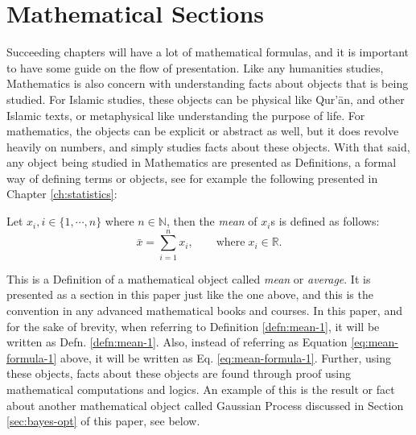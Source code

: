 \section{Mathematical Sections}
Succeeding chapters will have a lot of mathematical formulas, and it is important to have some guide on the flow of presentation. Like any humanities studies, Mathematics is also concern with understanding facts about objects that is being studied. For Islamic studies, these objects can be physical like Qur'\=an, and other Islamic texts, or metaphysical like understanding the purpose of life. For mathematics, the objects can be explicit or abstract as well, but it does revolve heavily on numbers, and simply studies facts about these objects. With that said, any object being studied in Mathematics are presented as Definitions, a formal way of defining terms or objects, see for example the following presented in Chapter \ref{ch:statistics}:
\begin{defn}[Mean]\label{defn:mean-1}
Let $x_i, i\in\{1,\cdots,n\}$ where $n\in\mathbb{N}$, then the \textit{mean} of $x_i$s is defined as follows:
\begin{equation}\label{eq:mean-formula-1}
    \bar{x} = \sum_{i=1}^n x_i, \qquad\text{where}\;x_i \in\mathbb{R}.
\end{equation}
\end{defn}
This is a Definition of a mathematical object called \textit{mean} or \textit{average}. It is presented as a section in this paper just like the one above, and this is the convention in any advanced mathematical books and courses. In this paper, and for the sake of brevity, when referring to Definition \ref{defn:mean-1}, it will be written as Defn. \ref{defn:mean-1}. Also, instead of referring as Equation \ref{eq:mean-formula-1} above, it will be written as Eq. \ref{eq:mean-formula-1}. Further, using these objects, facts about these objects are found through proof using mathematical computations and logics. An example of this is the result or fact about another mathematical object called Gaussian Process discussed in Section \ref{sec:bayes-opt} of this paper, see below.
